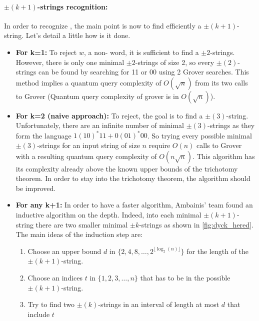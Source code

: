 \paragraph*{\textbf{$\pm (k+1)$-strings recognition:}}
In order to recognize , the main point is now to find efficiently
a $\pm(k+1)$-string. Let's detail a little how is it done.
\begin{itemize}
    \item \textbf{For k=1:} To reject $w$, a non- word, it is sufficient
          to find a $\pm 2$-strings. However, there is only one minimal
          $\pm 2$-strings of size 2, so every $\pm(2)$-strings can be
          found by searching for 11 or 00 using 2 Grover searches.
          This method implies a quantum query complexity of
          $O(\sqrt{n})$ from its two calls to Grover (Quantum query complexity
          of grover is in $O(\sqrt{n})$).
    \item \textbf{For k=2 (naive approach):} To reject, the goal is to find
          a $\pm(3)$-string. Unfortunately, there are an infinite number
          of minimal $\pm(3)$-strings as they form the language
          $1(10)^*11 + 0(01)^*00$. So trying every possible minimal
          $\pm(3)$-strings for an input string of size $n$ require $O(n)$
          calls to Grover with a resulting quantum query complexity of
          $O(n \sqrt{n})$. This algorithm has its complexity already
          above the known upper bounds of the trichotomy theorem.
          In order to stay into the trichotomy theorem, the algorithm
          should be improved.
    \item \textbf{For any k+1:} In order to have a faster algorithm,
          Ambainis' team found an inductive algorithm on the depth.
          Indeed, into each minimal $\pm(k+1)$-string there are two
          smaller minimal $\pm k$-strings as shown in \autoref{fig:dyck_hered}.
          The main ideas of the induction step are:
          \begin{enumerate}
              \item \label{alg:step1} Choose an upper bound $d$ in $\{2, 4, 8, \ldots, 2^{\lfloor \log_2(n) \rfloor}\}$
                    for the length of the $\pm(k+1)$-string.
              \item \label{alg:step2} Choose an indices $t$ in $\{1, 2, 3, \ldots, n\}$ that has to be in the  possible $\pm(k+1)$-string.
              \item \label{alg:step3} Try to find two $\pm(k)$-strings in an interval of length at most $d$ that include $t$

\end{enumerate}
\end{itemize}

